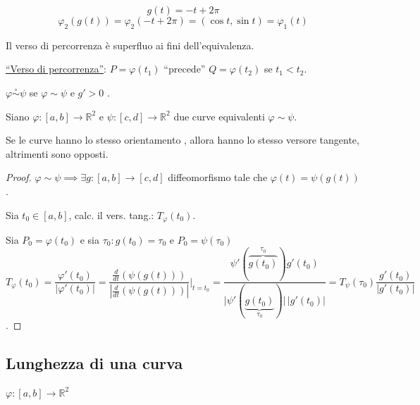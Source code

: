 \[
g(t) = -t + 2\pi
\]
\[
\varphi_2(g(t)) = \varphi_2(-t + 2\pi) = (\cos t, \sin t) = \varphi_1(t)
\]

\begin{oss}
Il verso di percorrenza è superfluo ai fini dell'equivalenza.
\end{oss}

\begin{definition}
\underline{``Verso di percorrenza''}: $P = \varphi(t_1)$ ``precede'' $Q = \varphi(t_2)$ se $t_1 < t_2$.
\end{definition}

\begin{definition}
$\varphi \stackrel{\circ}{\sim} \psi$ se $\varphi \sim \psi$ e $g' > 0$ .
\end{definition}

\begin{prop}
Siano $\varphi : [a, b] \to \mathbb{R}^2$ e $\psi : [c, d] \to \mathbb{R}^2$ due curve equivalenti $\varphi \sim \psi$.

Se le curve hanno lo stesso orientamento \pencilnote{($\stackrel{\circ}{\sim}$)}, allora hanno lo stesso versore tangente, altrimenti sono opposti.
\end{prop}

\begin{proof}
$\varphi \sim \psi \implies \exists g : [a, b] \to [c, d]$ diffeomorfismo  tale che $\varphi(t) = \psi(g(t))$.

Sia $t_0 \in [a, b]$, calc. il vers. tang.: $T_\varphi(t_0)$.

Sia $P_0 = \varphi(t_0)$ e sia $\tau_0 : g(t_0) = \tau_0$ e $P_0 = \psi(\tau_0)$
\[
T_\varphi(t_0) = \frac{\varphi'(t_0)}{\vert \varphi'(t_0) \vert} = \frac{\frac{d}{dt}(\psi(g(t)))}{\left\vert \frac{d}{dt}(\psi(g(t))) \right\vert} \Bigg|_{t = t_0} = \frac{\psi'(\overbrace{g(t_0)}^{\tau_0}) g'(t_0)}{\vert \psi'(\underbrace{g(t_0)}_{\tau_0}) \vert \, \vert g'(t_0) \vert} = T_\psi(\tau_0) \frac{g'(t_0)}{\vert g'(t_0) \vert}
\]
.
\end{proof}

\subsection{Lunghezza di una curva}

$\varphi : [a, b] \to \mathbb{R}^2$

